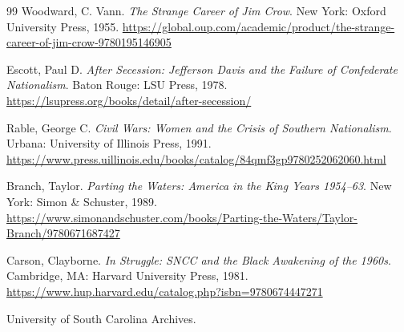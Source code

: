\documentclass[12pt]{article}
\begin{document}
\begin{thebibliography}{99}
Woodward, C. Vann.
\textit{The Strange Career of Jim Crow}.
New York: Oxford University Press, 1955.  
\href{https://global.oup.com/academic/product/the-strange-career-of-jim-crow-9780195146905}{https://global.oup.com/academic/product/the-strange-career-of-jim-crow-9780195146905}

Escott, Paul D.
\textit{After Secession: Jefferson Davis and the Failure of Confederate Nationalism}.
Baton Rouge: LSU Press, 1978.  
\href{https://lsupress.org/books/detail/after-secession/}{https://lsupress.org/books/detail/after-secession/}

Rable, George C.
\textit{Civil Wars: Women and the Crisis of Southern Nationalism}.
Urbana: University of Illinois Press, 1991.  
\href{https://www.press.uillinois.edu/books/catalog/84qmf3gp9780252062060.html}{https://www.press.uillinois.edu/books/catalog/84qmf3gp9780252062060.html}

Branch, Taylor.
\textit{Parting the Waters: America in the King Years 1954--63}.
New York: Simon \& Schuster, 1989.  
\href{https://www.simonandschuster.com/books/Parting-the-Waters/Taylor-Branch/9780671687427}{https://www.simonandschuster.com/books/Parting-the-Waters/Taylor-Branch/9780671687427}

Carson, Clayborne.
\textit{In Struggle: SNCC and the Black Awakening of the 1960s}.
Cambridge, MA: Harvard University Press, 1981.  
\href{https://www.hup.harvard.edu/catalog.php?isbn=9780674447271}{https://www.hup.harvard.edu/catalog.php?isbn=9780674447271}

University of South Carolina Archives. 

\end{thebibliography}
\end{document}
